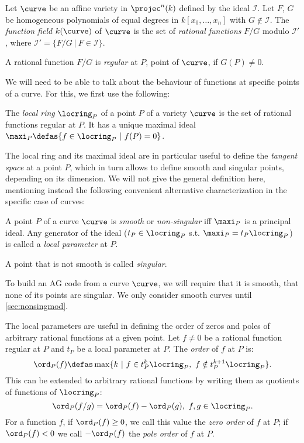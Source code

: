 \begin{defi}
Let $\curve$ be an affine variety in $\projec^n(k)$ defined by the ideal $\mathcal{I}$. Let $F$, $G$ be homogeneous polynomials of equal degrees in $k[x_0, \ldots, x_n]$
with $G \notin \mathcal{I}$. The \emph{function field} $k(\curve)$ of $\curve$ is the set of \emph{rational functions} $F/G$ modulo $\mathcal{I'}$,
where $\mathcal{I'} = \{F/G~|~ F \in \mathcal{I}\}$.

\noindent
A rational function $F/G$ is \emph{regular} at $P$, point of $\curve$, if $G(P) \neq 0$.
\end{defi}

We will need to be able to talk about the behaviour of functions at specific points of a curve. For this, we first use the following:

\begin{defi}
The \emph{local ring} $\locring_P$ of a point $P$ of a variety $\curve$ is the set of rational functions regular at $P$.
It has a unique maximal ideal $\maxi_P \defas \{f \in \locring_P ~|~ f(P) = 0\}$. 
\end{defi}

The local ring and its maximal ideal are in particular useful to define the \emph{tangent space} at a point $P$, which in turn allows to define smooth and singular points,
depending on its dimension.
We will not give the general definition here, mentioning instead  the following convenient alternative characterization in the specific case of curves:

\begin{defi}
A point $P$ of a curve $\curve$ is \emph{smooth} or \emph{non-singular} iff $\maxi_P$ is a principal ideal. Any generator of the ideal ($t_P \in \locring_P$ s.t. $\maxi_P = t_P\locring_P$)
is called a \emph{local parameter} at $P$.

\noindent
A point that is not smooth is called \emph{singular}.
\end{defi}

To build an AG code from a curve $\curve$, we will require that it is smooth, \ie that none of its points are singular.
We only consider smooth curves until \autoref{sec:nonsingmod}.

The local parameters are useful in defining the order of zeros and poles of arbitrary rational functions at a given point.
Let $f \neq 0$ be a rational function regular at $P$ and $t_P$ be a local parameter at $P$. The \emph{order} of $f$ at $P$ is:
\[
\ord_P(f) \defas \max \{k~ |~ f \in t_P^k\locring_P,~ f \notin t_P^{k+1}\locring_P\}.
\]
This can be extended to arbitrary rational functions by writing them as quotients of functions of $\locring_P$:
\[
\ord_P(f/g) = \ord_P(f) - \ord_P(g),~f,g\in\locring_P.
\]
For a function $f$, if $\ord_P(f) \geq 0$, we call this value the \emph{zero order} of $f$ at $P$; if $\ord_P(f) < 0$
we call $-\ord_P(f)$ the \emph{pole order} of $f$ at $P$.

